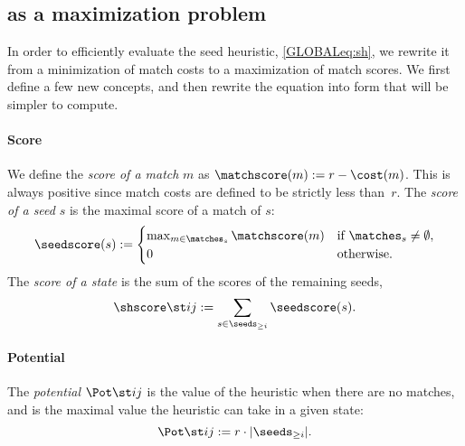 \subsection{\Sh as a maximization problem} \label{GLOBALsec:formulas-sh}

In order to efficiently evaluate the seed heuristic, \cref{GLOBALeq:sh}, we rewrite it
from a minimization of match costs to a maximization of match scores. We first
define a few new concepts, and then rewrite the equation into form that will be
simpler to compute.

\paragraph{Score}
We define the \emph{score of a match} $m$ as $\matchscore(m):={r-\cost(m)}$.
This is always positive since match costs are defined to be strictly less than~$r$.
The \emph{score of a seed} $s$ is the maximal score of a match of $s$:
\begin{equation}
  \seedscore(s) := \begin{cases}
    \max_{m\in \matches_s} \matchscore(m) &\text{if $\matches_s \neq \emptyset$}, \\
    0 &\text{otherwise.}
  \end{cases}\label{GLOBALeq:seedscore}
\end{equation}
The \emph{score of a state} is the sum of the scores of the remaining seeds,
\begin{equation} \label{GLOBALeq:sh-score}
  \shscore\st ij := \sum_{s\in \seeds_{\geq i}} \seedscore(s).
\end{equation}

\paragraph{Potential} The \emph{potential} $\Pot\st ij$ is the value of the
heuristic when there are no matches, and is the maximal value the heuristic can
take in a given state:
\begin{equation} \label{GLOBALeq:potential}
  \Pot\st ij := r\cdot |\seeds_{\geq i}|.
\end{equation}


